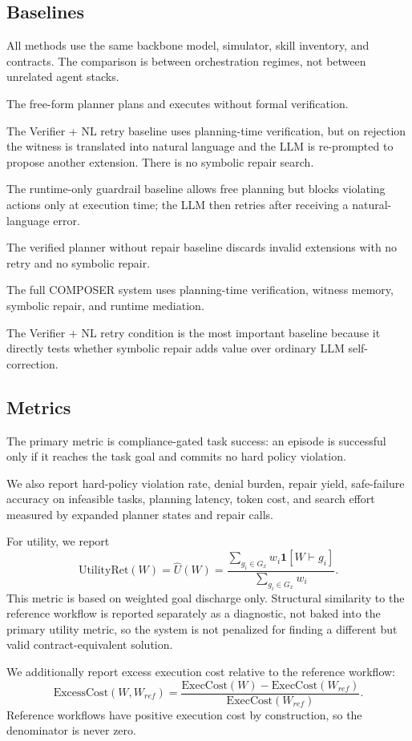\documentclass[11pt]{article}
\begin{document}
\subsection{Baselines}
All methods use the same backbone model, simulator, skill inventory, and contracts. The comparison is between orchestration regimes, not between unrelated agent stacks.

The free-form planner plans and executes without formal verification.

The Verifier + NL retry baseline uses planning-time verification, but on rejection the witness is translated into natural language and the LLM is re-prompted to propose another extension. There is no symbolic repair search.

The runtime-only guardrail baseline allows free planning but blocks violating actions only at execution time; the LLM then retries after receiving a natural-language error.

The verified planner without repair baseline discards invalid extensions with no retry and no symbolic repair.

The full COMPOSER system uses planning-time verification, witness memory, symbolic repair, and runtime mediation.

The Verifier + NL retry condition is the most important baseline because it directly tests whether symbolic repair adds value over ordinary LLM self-correction.

\subsection{Metrics}
The primary metric is compliance-gated task success: an episode is successful only if it reaches the task goal and commits no hard policy violation.

We also report hard-policy violation rate, denial burden, repair yield, safe-failure accuracy on infeasible tasks, planning latency, token cost, and search effort measured by expanded planner states and repair calls.

For utility, we report
\[
\text{UtilityRet}(W)=\hat U(W)=\frac{\sum_{g_i \in G_x} w_i \mathbf{1}[W \vdash g_i]}{\sum_{g_i \in G_x} w_i}.
\]
This metric is based on weighted goal discharge only. Structural similarity to the reference workflow is reported separately as a diagnostic, not baked into the primary utility metric, so the system is not penalized for finding a different but valid contract-equivalent solution.

We additionally report excess execution cost relative to the reference workflow:
\[
\text{ExcessCost}(W,W_{ref})=\frac{\text{ExecCost}(W)-\text{ExecCost}(W_{ref})}{\text{ExecCost}(W_{ref})}.
\]
Reference workflows have positive execution cost by construction, so the denominator is never zero.
\end{document}
